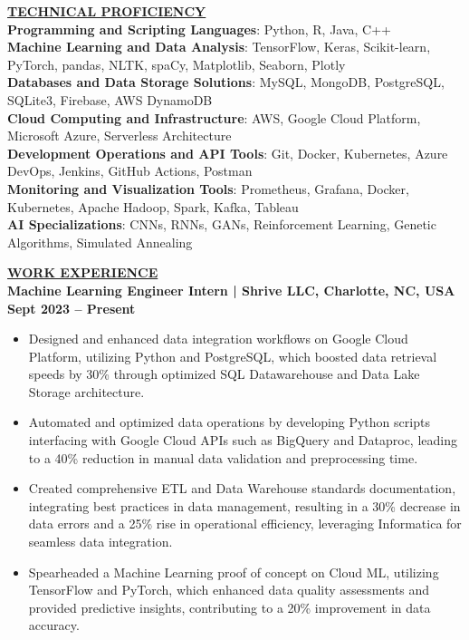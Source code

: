 \documentclass{article}
\begin{document}
\noindent \textbf{\underline{TECHNICAL PROFICIENCY}} \\
\textbf{Programming and Scripting Languages}{: \small Python, R, Java, C++} \\
\textbf{Machine Learning and Data Analysis}{: \small TensorFlow, Keras, Scikit-learn, PyTorch, pandas, NLTK, spaCy, Matplotlib, Seaborn, Plotly} \\
\textbf{Databases and Data Storage Solutions}{: \small MySQL, MongoDB, PostgreSQL, SQLite3, Firebase, AWS DynamoDB} \\
\textbf{Cloud Computing and Infrastructure}{: \small AWS, Google Cloud Platform, Microsoft Azure, Serverless Architecture} \\
\textbf{Development Operations and API Tools}{: \small Git, Docker, Kubernetes, Azure DevOps, Jenkins, GitHub Actions, Postman} \\
\textbf{Monitoring and Visualization Tools}{: \small Prometheus, Grafana, Docker, Kubernetes, Apache Hadoop, Spark, Kafka, Tableau} \\
\textbf{AI Specializations}{: \small CNNs, RNNs, GANs, Reinforcement Learning, Genetic Algorithms, Simulated Annealing} 

\vspace{2mm} 


\noindent \textbf{\underline{WORK EXPERIENCE}}\\
\noindent \textbf{Machine Learning Engineer Intern | Shrive LLC, Charlotte, NC, USA} \hfill \textbf{Sept 2023 – Present}
\begin{itemize}[noitemsep,nolistsep,leftmargin=*]
\item {\small Designed and enhanced data integration workflows on Google Cloud Platform, utilizing Python and PostgreSQL, which boosted data retrieval speeds by 30\% through optimized SQL Datawarehouse and Data Lake Storage architecture.}
\item {\small Automated and optimized data operations by developing Python scripts interfacing with Google Cloud APIs such as BigQuery and Dataproc, leading to a 40\% reduction in manual data validation and preprocessing time.}
\item {\small Created comprehensive ETL and Data Warehouse standards documentation, integrating best practices in data management, resulting in a 30\% decrease in data errors and a 25\% rise in operational efficiency, leveraging Informatica for seamless data integration.}
\item {\small Spearheaded a Machine Learning proof of concept on Cloud ML, utilizing TensorFlow and PyTorch, which enhanced data quality assessments and provided predictive insights, contributing to a 20\% improvement in data accuracy.}
\end{itemize}
\end{document}
